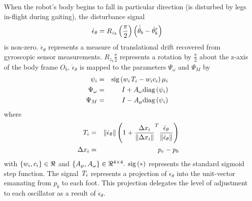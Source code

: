 			When the robot's body begins to fall in particular direction (\IE is disturbed by legs in-flight during gaiting), the disturbance signal 
				\begin{equation}
					\dot{\epsilon}_{\theta} = {R}_{z_{b}}\left(\frac{\pi}{2}\right)\left(\dot{\hat{\theta}}_{b} - \dot{\theta}_{b}^{r}\right)
				\end{equation}
			is non-zero. $\dot{\epsilon}_{\theta}$ represents a measure of translational drift recovered from gyroscopic sensor measurements. ${R}_{z_{b}}{\frac{\pi}{2}}$ represents a rotation by $\frac{\pi}{2}$ about the z-axis of the body frame $O_{b}$. $\dot{\epsilon}_{\theta}$ is mapped to the parameters $\Psi_{\omega}$ and $\Psi_{M}$ by
				\begin{eqnarray}
					\psi_{i} 			&=& \text{sig}\left(  w_{i} \emph{T}_{i} - w_{i} c_{i} \right) {\mu}_{i} 	\nonumber\\
					\Psi_{\omega} 		&=& I + A_{\omega}\text{diag}\left( \psi_{i} \right) 						\nonumber\\
					\Psi_{M}			&=& I - A_{\mu} \text{diag}\left(  \psi_{i} \right) 
					\label{eq::cpg_modulations}
				\end{eqnarray}
			where
				\begin{eqnarray}
					\emph{T}_{i} 		&=& \left\lVert \dot{\epsilon}_{\theta} \right\rVert \left(1 + \frac{\Delta x_{i}}{\left\lVert\Delta x_{i}\right\rVert}^T  \frac{ \dot{\epsilon}_{\theta}  }{\left\lVert \dot{\epsilon}_{\theta}  \right\rVert} \right)	\nonumber\\\
					\Delta x_{i}		&=& {p}_{e} - {p}_{b}
				\end{eqnarray}
			with $\{w_{i}, c_{i}\} \in\Re^{}$ and $\{A_{\mu}, A_{\omega}\}   \in\Re^{4\times4}.$ $\text{sig}\left(*\right)$ represents the standard
			sigmoid step function. The signal $\emph{T}_{i}$ represents a projection of $\dot{\epsilon}_{\theta}$ into the unit-vector emanating from ${p}_{b}$ to each \Ith foot. This projection delegates the level of adjustment to each \Ith oscillator as a result of $\dot{\epsilon}_{\theta}$. 		

